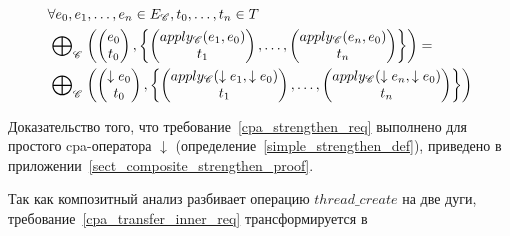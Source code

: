 \begin{itemize}
\begin{equation}
\label{cpa_strengthen_req}
\begin{aligned}
& \forall e_0, e_1, \dots, e_n \in E_{\mathscr{C}}, t_0, \dots, t_n \in T \\
& \mathrel{\bigoplus}_{\mathscr{C}}
\left(
\begin{pmatrix}
e_0 \\
t_0 
\end{pmatrix},
\left\{
\begin{pmatrix}
apply_{\mathscr{C}}(e_1, e_0) \\
t_1 
\end{pmatrix},
\dots ,
\begin{pmatrix}
apply_{\mathscr{C}}(e_n, e_0) \\
t_n 
\end{pmatrix}
\right\}
\right) = \\
& \mathrel{\bigoplus}_{\mathscr{C}}
\left(
\begin{pmatrix}
\downarrow e_0 \\
t_0 
\end{pmatrix},
\left\{
\begin{pmatrix}
apply_{\mathscr{C}}(\downarrow e_1, \downarrow e_0) \\
t_1 
\end{pmatrix},
\dots ,
\begin{pmatrix}
apply_{\mathscr{C}}(\downarrow e_n, \downarrow e_0) \\
t_n 
\end{pmatrix}
\right\}
\right)
\end{aligned}
\end{equation}

Доказательство того, что требование~\ref{cpa_strengthen_req} выполнено для простого cpa-оператора $\downarrow$ (определение~\ref{simple_strengthen_def}), приведено в приложении~\ref{sect_composite_strengthen_proof}.

Так как композитный анализ разбивает операцию $thread\_create$ на две дуги, требование~\ref{cpa_transfer_inner_req} трансформируется в


\end{itemize}
